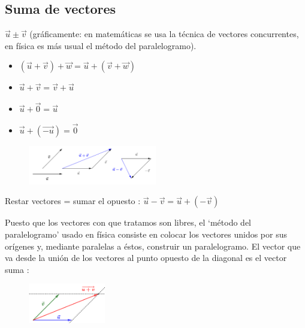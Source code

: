 \subsection{Suma de vectores}

	$\vec u \pm \vec v$  (gráficamente: en matemáticas se usa la técnica de vectores concurrentes, en física es más usual el método del paralelogramo).
	\begin{multicols}{2}
	
	\begin{itemize}
		\item $(\vec u + \vec v)+ \vec w=\vec u+(\vec v + \vec w)$
		\vspace{-2mm}\item $\vec u + \vec v= \vec v+ \vec u$
		\vspace{-2mm}\item $\vec u+ \vec 0=\vec u$
		\vspace{-2mm}\item $\vec u+ (\overrightarrow {-u})=\vec 0$
	\end{itemize}
	\begin{figure}[H]
		\centering
		\includegraphics[width=0.5\textwidth]{imagenes/imagenes10/T10IM03.png}
	\end{figure}
	\end{multicols}
	Restar vectores = sumar el opuesto : $\vec u - \vec v = \vec u +(-\vec v)$

\begin{multicols}{2}
	\scriptsize{Puesto que los vectores con que tratamos son libres, el `método del paralelogramo' usado en física consiste en colocar los vectores unidos por sus orígenes y, mediante paralelas a éstos, construir un paralelogramo. El vector que va desde la unión de los vectores al punto opuesto de la diagonal es el vector suma}  \normalsize{:}

	\begin{figure}[H]
	\centering
	\includegraphics[width=0.3\textwidth]{imagenes/imagenes10/T10IM14.png}
	\end{figure}
\end{multicols}

